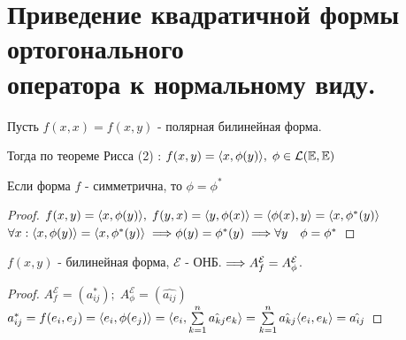 \section{Приведение квадратичной формы ортогонального \\ оператора к нормальному виду.}

Пусть $f(x,x) = f(x,y)$ - полярная билинейная форма.

Тогда по теореме Рисса (2) : $f(x,y) = \langle x, \phi(y) \rangle, \; \phi \in \mathcal{L}(\mathbb{E},\mathbb{E})$

\begin{shth}
    \begin{theorem}
        \leavevmode \nl 
        
        Если форма $f$ - симметрична, то $\phi = \phi^*$
    
    \end{theorem}
\end{shth}

\begin{proof}
    \leavevmode \nl 
    
    $f(x,y) = \langle x, \phi(y) \rangle,  \; f(y,x) = \langle y, \phi(x) \rangle = \langle \phi(x), y \rangle = \langle x, \phi^*(y) \rangle$ \\
    
    
    $ \forall x : \langle x, \phi(y) \rangle = \langle x, \phi^*(y) \rangle \; \Longrightarrow \phi(y) = \phi^*(y) \; \Longrightarrow \forall y \quad \phi = \phi^*$
\end{proof}

\begin{shth}
    \begin{theorem}
        $ f(x,y)$ - билинейная форма, $ \mathcal{E}$ - ОНБ. $ \Longrightarrow A_{f}^{\mathcal{E}} = A_{\phi}^{\mathcal{E}}$.
    \end{theorem}
\end{shth}

\vspace{0.3cm}
\begin{proof}
    
    $ A_{f}^{\mathcal{E}} = (a_{ij}^*) ; \;  A_{\phi}^{\mathcal{E}} = (\hat{a_{ij}})$ \\
    
    $ a_{ij}^* = f(e_{i}, e_{j}) = \langle e_{i}, \phi(e_{j}) \rangle = \langle e_{i}, \sum\limits_{k=1}^{n} \hat{a_{kj}} e_{k} \rangle = \sum\limits_{k=1}^{n} \hat{a_{kj}} \langle e_{i}, e_{k} \rangle = \hat{a_{ij}}$
\end{proof}

